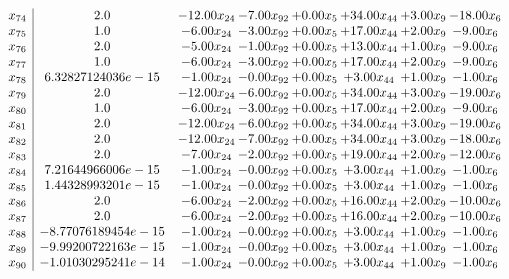 \documentclass[8pt]{article}
\begin{document}
\[\begin{array}{c| c c@{\hskip 2pt} c@{\hskip 2pt} c@{\hskip 2pt} c@{\hskip 2pt} c@{\hskip 2pt} c@{\hskip 2pt} }
 x_{74}   &  2.0 & -12.00 x_{24} & -7.00 x_{92} & +  0.00 x_{5} & + 34.00 x_{44} & +  3.00 x_{9} & -18.00 x_{6}\\
 x_{75}   &  1.0 & -6.00 x_{24} & -3.00 x_{92} & +  0.00 x_{5} & + 17.00 x_{44} & +  2.00 x_{9} & -9.00 x_{6}\\
 x_{76}   &  2.0 & -5.00 x_{24} & -1.00 x_{92} & +  0.00 x_{5} & + 13.00 x_{44} & +  1.00 x_{9} & -9.00 x_{6}\\
 x_{77}   &  1.0 & -6.00 x_{24} & -3.00 x_{92} & +  0.00 x_{5} & + 17.00 x_{44} & +  2.00 x_{9} & -9.00 x_{6}\\
 x_{78}   &  6.32827124036e-15 & -1.00 x_{24} & -0.00 x_{92} & +  0.00 x_{5} & +  3.00 x_{44} & +  1.00 x_{9} & -1.00 x_{6}\\
 x_{79}   &  2.0 & -12.00 x_{24} & -6.00 x_{92} & +  0.00 x_{5} & + 34.00 x_{44} & +  3.00 x_{9} & -19.00 x_{6}\\
 x_{80}   &  1.0 & -6.00 x_{24} & -3.00 x_{92} & +  0.00 x_{5} & + 17.00 x_{44} & +  2.00 x_{9} & -9.00 x_{6}\\
 x_{81}   &  2.0 & -12.00 x_{24} & -6.00 x_{92} & +  0.00 x_{5} & + 34.00 x_{44} & +  3.00 x_{9} & -19.00 x_{6}\\
 x_{82}   &  2.0 & -12.00 x_{24} & -7.00 x_{92} & +  0.00 x_{5} & + 34.00 x_{44} & +  3.00 x_{9} & -18.00 x_{6}\\
 x_{83}   &  2.0 & -7.00 x_{24} & -2.00 x_{92} & +  0.00 x_{5} & + 19.00 x_{44} & +  2.00 x_{9} & -12.00 x_{6}\\
 x_{84}   &  7.21644966006e-15 & -1.00 x_{24} & -0.00 x_{92} & +  0.00 x_{5} & +  3.00 x_{44} & +  1.00 x_{9} & -1.00 x_{6}\\
 x_{85}   &  1.44328993201e-15 & -1.00 x_{24} & -0.00 x_{92} & +  0.00 x_{5} & +  3.00 x_{44} & +  1.00 x_{9} & -1.00 x_{6}\\
 x_{86}   &  2.0 & -6.00 x_{24} & -2.00 x_{92} & +  0.00 x_{5} & + 16.00 x_{44} & +  2.00 x_{9} & -10.00 x_{6}\\
 x_{87}   &  2.0 & -6.00 x_{24} & -2.00 x_{92} & +  0.00 x_{5} & + 16.00 x_{44} & +  2.00 x_{9} & -10.00 x_{6}\\
 x_{88}   &  -8.77076189454e-15 & -1.00 x_{24} & -0.00 x_{92} & +  0.00 x_{5} & +  3.00 x_{44} & +  1.00 x_{9} & -1.00 x_{6}\\
 x_{89}   &  -9.99200722163e-15 & -1.00 x_{24} & -0.00 x_{92} & +  0.00 x_{5} & +  3.00 x_{44} & +  1.00 x_{9} & -1.00 x_{6}\\
 x_{90}   &  -1.01030295241e-14 & -1.00 x_{24} & -0.00 x_{92} & +  0.00 x_{5} & +  3.00 x_{44} & +  1.00 x_{9} & -1.00 x_{6}\\

\end{array}\]
\end{document}
